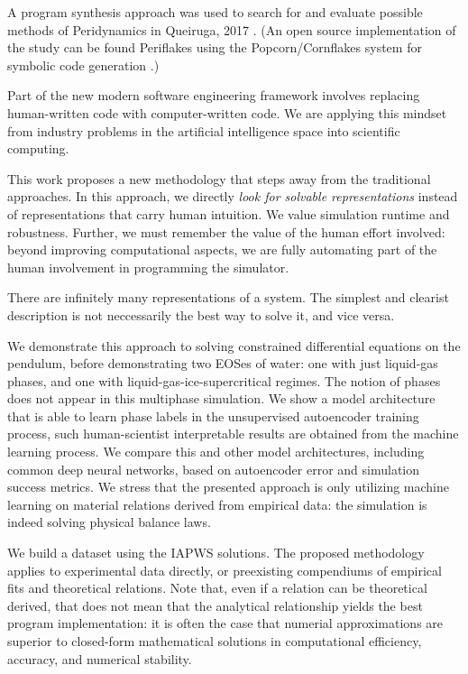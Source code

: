 \documentclass[AMA,STIX1COL]{WileyNJD-v2}
\begin{document}
 A program synthesis approach was used to search for and evaluate
 possible methods of Peridynamics in Queiruga, 2017
 \cite{queiruga_numerical_2017}. (An open source implementation of the
 study can be found Periflakes\cite{queiruga_periflakes_2019} using the
 Popcorn/Cornflakes system for symbolic code generation
 \cite{queiruga_cornflakes:_2018,queiruga_popcorn:_2018}.)

Part of the new modern software engineering framework involves replacing
human-written code with computer-written code. We are applying this
mindset from industry problems in the artificial
intelligence space into scientific computing.


This work proposes a new methodology that steps away from the
traditional approaches. 
In this approach, we directly \emph{look for solvable representations}
instead of representations that carry human intuition. We value
simulation runtime and robustness. Further, we must remember the value
of the human effort involved: beyond improving computational aspects,
we are fully automating part of the human involvement in programming
the simulator.

There are infinitely many representations of a system. The simplest and clearist description is not neccessarily the best way
to solve it, and vice versa.


We demonstrate this approach to solving constrained differential
equations on the pendulum, before demonstrating two EOSes of water: one
with just liquid-gas phases, and one with liquid-gas-ice-supercritical
regimes. The notion of phases does not appear in this multiphase
simulation. We show a model architecture that is able to learn phase
labels in the unsupervised autoencoder training process, such
human-scientist interpretable results are obtained from the machine
learning process. We compare this and other model architectures,
including common deep neural networks, based on autoencoder error and
simulation success metrics. We stress that the presented approach is
only utilizing machine learning on material relations derived from
empirical data: the simulation is indeed solving physical balance laws.

We build a dataset using the IAPWS solutions. The proposed
methodology applies to experimental data directly, or preexisting
compendiums of empirical fits and theoretical relations.
Note that, even if a relation can be theoretical derived, that does
not mean that the analytical relationship yields the best program
implementation: it is often the case that numerial approximations are
superior to closed-form mathematical solutions in computational
efficiency, accuracy, and numerical stability.
\end{document}
